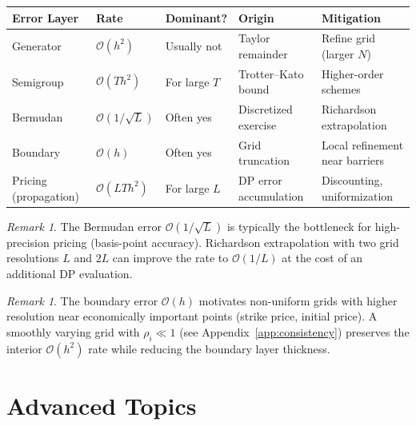 \documentclass[11pt,a4paper,openany]{book}
\theoremstyle{definition}
\theoremstyle{plain}
\theoremstyle{remark}
\newtheorem{remark}[theorem]{Remark}
\newcommand{\1}{\mathbbm{1}}
\begin{document}
\begin{center}
\begin{tabular}{>{\raggedright\arraybackslash}p{2.2cm}>{\raggedright\arraybackslash}p{2.2cm}>{\raggedright\arraybackslash}p{2cm}>{\raggedright\arraybackslash}p{3cm}>{\raggedright\arraybackslash}p{2.5cm}}
\toprule
\textbf{Error Layer} & \textbf{Rate} & \textbf{Dominant?} & \textbf{Origin} & \textbf{Mitigation} \\
\midrule
Generator & $\mathcal{O}(h^{2})$ & Usually not & Taylor remainder & Refine grid (larger $N$) \\
Semigroup & $\mathcal{O}(T h^{2})$ & For large $T$ & Trotter--Kato bound & Higher-order schemes \\
Bermudan & $\mathcal{O}(1/\sqrt{L})$ & Often yes & Discretized exercise & Richardson extrapolation \\
Boundary & $\mathcal{O}(h)$ & Often yes & Grid truncation & Local refinement near barriers \\
Pricing (propagation) & $\mathcal{O}(L T h^{2})$ & For large $L$ & DP error accumulation & Discounting, uniformization \\
\bottomrule
\end{tabular}
\end{center}

\begin{remark}
The Bermudan error $\mathcal{O}(1/\sqrt{L})$ is typically the bottleneck for high-precision pricing (basis-point accuracy). Richardson extrapolation with two grid resolutions $L$ and $2L$ can improve the rate to $\mathcal{O}(1/L)$ at the cost of an additional DP evaluation.
\end{remark}

\begin{remark}
The boundary error $\mathcal{O}(h)$ motivates non-uniform grids with higher resolution near economically important points (strike price, initial price). A smoothly varying grid with $\rho_{i} \ll 1$ (see Appendix~\ref{app:consistency}) preserves the interior $\mathcal{O}(h^{2})$ rate while reducing the boundary layer thickness.
\end{remark}

\part{Advanced Topics}
\end{document}
